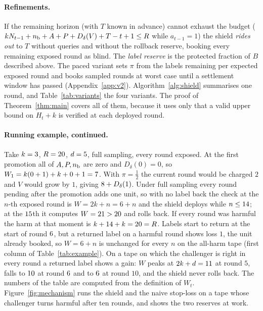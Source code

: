\documentclass[10pt]{article}
\theoremstyle{plain}
\theoremstyle{definition}
\begin{document}
\paragraph{Refinements.}
If the remaining horizon (with $T$ known in advance) cannot exhaust the budget ($kN_{t-1}+n_{\rm b}+A+P+D_\delta(V)+T-t+1\le R$ while $a_{t-1}=1$) the shield \emph{rides out} to $T$ without queries and without the rollback reserve, booking every remaining exposed round as blind. The \emph{label reserve} is the protected fraction of $B$ described above. The paced variant sets $\pi$ from the labels remaining per expected exposed round and books sampled rounds at worst case until a settlement window has passed (Appendix~\ref{app:v2}). Algorithm~\ref{alg:shield} summarises one round, and Table~\ref{tab:variants} the four variants. The proof of Theorem~\ref{thm:main} covers all of them, because it uses only that a valid upper bound on $H_t+k$ is verified at each deployed round.

\paragraph{Running example, continued.}
Take $k=3$, $R=20$, $d=5$, full sampling, every round exposed. At the first promotion all of $A,P,n_{\rm b}$ are zero and $D_\delta(0)=0$, so $W_1=k(0+1)+k+0+1=7$. With $\pi=\tfrac12$ the current round would be charged $2$ and $V$ would grow by $1$, giving $8+D_\delta(1)$. Under full sampling every round pending after the promotion adds one unit, so with no label back the check at the $n$-th exposed round is $W=2k+n=6+n$ and the shield deploys while $n\le14$; at the $15$th it computes $W=21>20$ and rolls back. If every round was harmful the harm at that moment is $k+14+k=20=R$. Labels start to return at the start of round $6$, but a returned label on a harmful round shows loss $1$, the unit already booked, so $W=6+n$ is unchanged for every $n$ on the all-harm tape (first column of Table~\ref{tab:example}). On a tape on which the challenger is right in every round a returned label shows a gain: $W$ peaks at $2k+d=11$ at round $5$, falls to $10$ at round $6$ and to $6$ at round $10$, and the shield never rolls back. The numbers of the table are computed from the definition of $W_t$. Figure~\ref{fig:mechanism} runs the shield and the naive stop-loss on a tape whose challenger turns harmful after ten rounds, and shows the two reserves at work.
\end{document}
